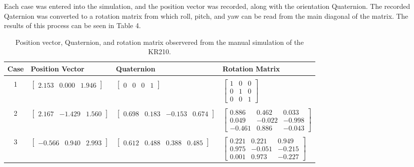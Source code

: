 \documentclass[a4paper]{article}
\begin{document}
Each case was entered into the simulation, and the position vector was recorded, along with the orientation Quaternion. The recorded Qaternion was converted to a rotation matrix from which roll, pitch, and yaw can be read from the main diagonal of the matrix. The results of this process can be seen in Table 4.

\begin{table}[h]
	\centering
	\caption{Position vector, Quaternion, and rotation matrix observered from the manual simulation of the KR210.}
	\small
	\begin{tabular}{clll}
		\toprule
		\textbf{Case} & \textbf{Position Vector} & \textbf{Quaternion} & \textbf{Rotation Matrix}\\
		\midrule
		 & & & \\
		1 & $\begin{bmatrix}2.153 & 0.000 & 1.946\end{bmatrix}$ & $\begin{bmatrix}0 & 0 & 0 & 1\end{bmatrix}$ & $\begin{bmatrix}1 & 0 & 0 \\ 0 & 1 & 0 \\ 0 & 0 & 1\end{bmatrix}$\\
		 & & & \\
		2 & $\begin{bmatrix}2.167 & -1.429 & 1.560\end{bmatrix}$ & $\begin{bmatrix}0.698 & 0.183 & -0.153 & 0.674\end{bmatrix}$ & $\begin{bmatrix}0.886 & 0.462 & 0.033 \\ 0.049 & -0.022 & -0.998 \\ -0.461 & 0.886 & -0.043\end{bmatrix}$\\
		 & & & \\
		3 & $\begin{bmatrix}-0.566 & 0.940 & 2.993\end{bmatrix}$ & $\begin{bmatrix}0.612 & 0.488 & 0.388 & 0.485\end{bmatrix}$ & $\begin{bmatrix}0.221 & 0.221 & 0.949 \\ 0.975 & -0.051 & -0.215 \\ 0.001 & 0.973 & -0.227\end{bmatrix}$\\

\end{tabular}
\end{table}
\end{document}
